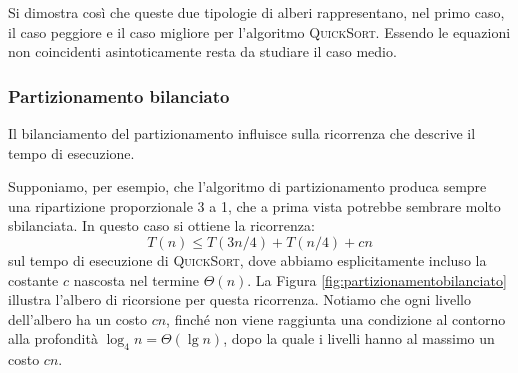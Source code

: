 \begin{center}
	\label{fig:alberoricorrenzaist1qs}
\end{center}

Si dimostra così che queste due tipologie di alberi rappresentano, nel primo caso, il caso peggiore e il caso migliore per l'algoritmo \textsc{QuickSort}. Essendo le equazioni non coincidenti asintoticamente resta da studiare il caso medio.

\subsubsection{Partizionamento bilanciato}
Il bilanciamento del partizionamento influisce sulla ricorrenza che descrive il tempo di esecuzione.

Supponiamo, per esempio, che l'algoritmo di partizionamento produca sempre una ripartizione proporzionale 3 a 1, che a prima vista potrebbe sembrare molto sbilanciata. In questo caso si ottiene la ricorrenza:
\begin{equation}
	T(n)\leq T(3n/4) + T(n/4) + cn
\end{equation}
sul tempo di esecuzione di \textsc{QuickSort}, dove abbiamo esplicitamente incluso la costante $c$ nascosta nel termine $\Theta(n)$. La Figura \ref{fig:partizionamentobilanciato} illustra l'albero di ricorsione per questa ricorrenza. Notiamo che ogni livello dell'albero ha un costo $cn$, finché non viene raggiunta una condizione al contorno alla profondità $\log_{4} n = \Theta(\lg n)$, dopo la quale i livelli hanno al massimo un costo $cn$.

